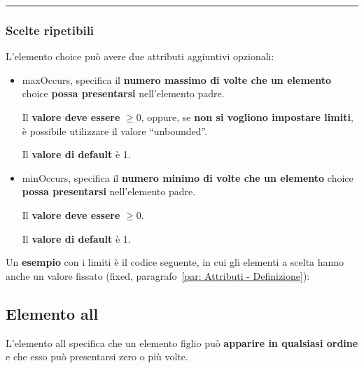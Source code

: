 \documentclass[a4paper]{article}
\newcommand{\longline}{\noindent\rule{\textwidth}{0.4pt}}
\newcommand{\dquotes}[1]{``#1''}
\begin{document}
	\longline
	
	\subsubsection{Scelte ripetibili}
	
	L'elemento \textsf{choice} può avere due attributi aggiuntivi opzionali:
	\begin{itemize}
		\item \textcolor{Red3}{\textsf{maxOccurs}}, specifica il \textbf{numero massimo di volte che un elemento} \textsf{choice} \textbf{possa presentarsi} nell'elemento padre.
		
		Il \textbf{valore deve essere} $\ge 0$, oppure, se \textbf{non si vogliono impostare limiti}, è possibile utilizzare il valore \dquotes{\textsf{unbounded}}.
		
		Il \textbf{valore di default} è 1.
		
		\item \textcolor{Red3}{\textsf{minOccurs}}, specifica il \textbf{numero minimo di volte che un elemento} \textsf{choice} \textbf{possa presentarsi} nell'elemento padre.
		
		Il \textbf{valore deve essere} $\ge 0$.
		
		Il \textbf{valore di default} è 1.
	\end{itemize}\newpage
	
	\noindent
	Un \textcolor{Green4}{\textbf{esempio}} con i limiti è il codice seguente, in cui gli elementi a scelta hanno anche un valore fissato (\textsf{fixed}, paragrafo~\ref{par: Attributi - Definizione}):
	\newpage
	
	\subsection{Elemento \textsf{all}}
	
	L'elemento \textcolor{Red3}{\textsf{all}} specifica che un elemento figlio può \textbf{apparire in qualsiasi ordine} e che esso può presentarsi zero o più volte.\newline
	
\end{document}
